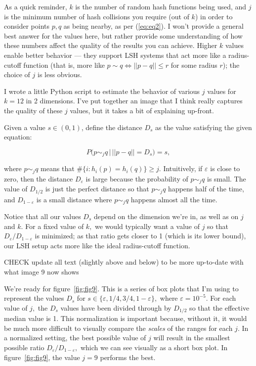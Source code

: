 \documentclass[20pt,]{extarticle}
\begin{document}
As a quick reminder, \(k\) is the number of random hash functions being
used, and \(j\) is the minimum number of hash collisions you require
(out of \(k\)) in order to consider points \(p, q\) as being nearby, as
per (\ref{eq:eq2}). I won't provide a general best answer for the values
here, but rather provide some understanding of how these numbers affect
the quality of the results you can achieve. Higher \(k\) values enable
better behavior --- they support LSH systems that act more like a
radius-cutoff function (that is, more like \(p\sim q \iff ||p-q||\le r\)
for some radius \(r\)); the choice of \(j\) is less obvious.

I wrote a little Python script to estimate the behavior of various \(j\)
values for \(k=12\) in 2 dimensions. I've put together an image that I
think really captures the quality of these \(j\) values, but it takes a
bit of explaining up-front.

Given a value \(s \in (0, 1)\), define the distance \(D_s\) as the value
satisfying the given equation:

\begin{equation} P\big(p \sim_j q \, \big| \, ||p-q|| = D_s\big) = s, \label{eq:eq4}\end{equation}

where \(p\sim_j q\) means that \(\#\{i : h_i(p) = h_i(q)\} \ge j.\)
Intuitively, if \(\varepsilon\) is close to zero, then the distance
\(D_\varepsilon\) is large because the probability of \(p\sim_j q\) is
small. The value of \(D_{1/2}\) is just the perfect distance so that
\(p \sim_j q\) happens half of the time, and \(D_{1-\varepsilon}\) is a
small distance where \(p \sim_j q\) happens almost all the time.

Notice that all our values \(D_s\) depend on the dimension we're in, as
well as on \(j\) and \(k.\) For a fixed value of \(k,\) we would
typically want a value of \(j\) so that
\(D_\varepsilon / D_{1 - \varepsilon}\) is minimized; as that ratio gets
closer to 1 (which is its lower bound), our LSH setup acts more like the
ideal radius-cutoff function.

CHECK update all text (slightly above and below) to be more up-to-date
with what image 9 now shows

We're ready for figure~\ref{fig:fig9}. This is a series of box plots
that I'm using to represent the values \(D_s\) for
\(s \in \{\varepsilon, 1/4, 3/4, 1 - \varepsilon\},\) where
\(\varepsilon = 10^{-5}.\) For each value of \(j,\) the \(D_s\) values
have been divided through by \(D_{1/2}\) so that the effective median
value is 1. This normalization is important because, without it, it
would be much more difficult to visually compare the \emph{scales} of
the ranges for each \(j.\) In a normalized setting, the best possible
value of \(j\) will result in the smallest possible ratio
\(D_\varepsilon / D_{1 - \varepsilon},\) which we can see visually as a
short box plot. In figure~\ref{fig:fig9}, the value \(j=9\) performs the
best.
\end{document}
